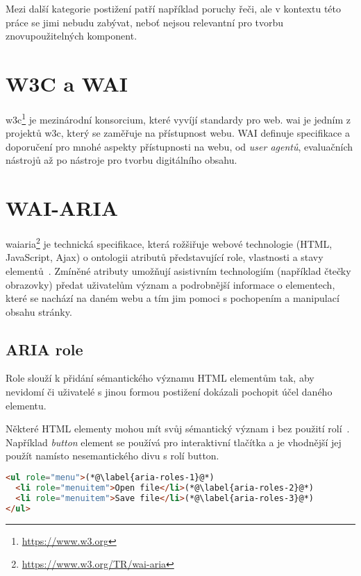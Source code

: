 Mezi další kategorie postižení patří například poruchy řeči, ale v kontextu této práce se jimi nebudu zabývat, neboť nejsou relevantní pro tvorbu znovupoužitelných komponent.

\section{W3C a WAI}


\gls{w3c}\footnote{\url{https://www.w3.org}} je mezinárodní konsorcium, které vyvíjí standardy pro web.
\gls{wai} je jedním z projektů \gls{w3c}, který se zaměřuje na přístupnost webu.
WAI definuje specifikace a doporučení pro mnohé aspekty přístupnosti na webu, od \textit{user agentů}, evaluačních nástrojů až po nástroje pro tvorbu digitálního obsahu.

\section{WAI-ARIA}

\gls{waiaria}\footnote{\url{https://www.w3.org/TR/wai-aria}} je technická specifikace, která rožšiřuje webové technologie (HTML, JavaScript, Ajax) o ontologii atributů představující role, vlastnosti a stavy elementů~\cite{wai-aria}.
Zmíněné atributy umožňují asistivním technologiím (například čtečky obrazovky) předat uživatelům význam a podrobnější informace o elementech, které se nachází na daném webu a tím jim pomoci s pochopením a manipulací obsahu stránky.

\subsection{ARIA role}

Role slouží k přidání sémantického významu HTML elementům tak, aby nevidomí či uživatelé s jinou formou postižení dokázali pochopit účel daného elementu.

Některé HTML elementy mohou mít svůj sémantický význam i bez použití rolí~\cite{wai-implicit-semantics}.
Například \textit{button} element se používá pro interaktivní tlačítka a je vhodnější jej použít namísto nesemantického divu s rolí button.

\clearpage

\begin{lstlisting}[caption={Aria role}, label={aria-roles}, language=html]
<ul role="menu">(*@\label{aria-roles-1}@*)
  <li role="menuitem">Open file</li>(*@\label{aria-roles-2}@*)
  <li role="menuitem">Save file</li>(*@\label{aria-roles-3}@*)
</ul>
\end{lstlisting}

